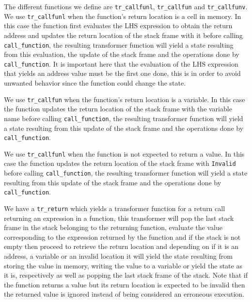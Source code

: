 The different functions we define are \verb|tr_callfunl|, \verb|tr_callfun| and \verb|tr_callfunv|.
We use \verb|tr_callfunl| when the function's return location is a cell in memory.
In this case the function first evaluates the LHS expression to obtain the return address and updates the return location of the stack frame with it before calling \verb|call_function|, the resulting transformer function will yield a state resulting from this evaluation, the update of the stack frame and the operations done by \verb|call_function|.
It is important here that the evaluation of the LHS expression that yields an address value must be the first one done, this is in order to avoid unwanted behavior since the function could change the state.

\begin{comment}
You can do a better job at clarifying this!
\end{comment}

We use \verb|tr_callfun| when the function's return location is a variable.
In this case the function updates the return location of the stack frame with the variable name before calling \verb|call_function|, the resulting transformer function will yield a state resulting from this update of the stack frame and the operations done by \verb|call_function|.

We use \verb|tr_callfunl| when the function is not expected to return a value.
In this case the function updates the return location of the stack frame with \verb|Invalid| before calling \verb|call_function|, the resulting transformer function will yield a state resulting from this update of the stack frame and the operations done by \verb|call_function|.

We have a \verb|tr_return| which yields a transformer function for a return call returning an expression in a function, this transformer will pop the last stack frame in the stack belonging to the returning function, evaluate the value corresponding to the expression returned by the function and if the stack is not empty then proceed to retrieve the return location and depending on if it is an address, a variable or an invalid location it will yield the state resulting from storing the value in memory, writing the value to a variable or yield the state as it is, respectively as well as popping the last stack frame of the stack.
Note that if the function returns a value but its return location is expected to be invalid then the returned value is ignored instead of being considered an erroneous execution.

